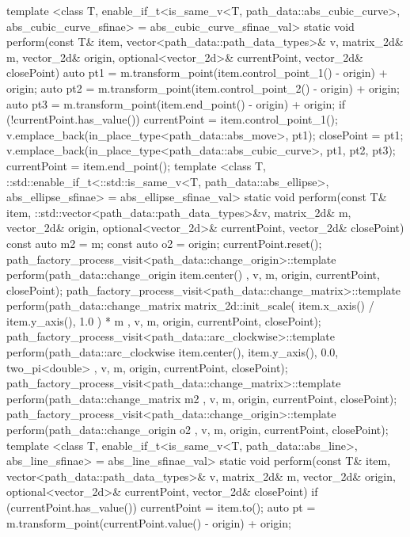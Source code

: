 \begin{codeblock}
{{      template <class T, enable_if_t<is_same_v<T, path_data::abs_cubic_curve>, abs_cubic_curve_sfinae> = abs_cubic_curve_sfinae_val>
      static void perform(const T& item, vector<path_data::path_data_types>& v, matrix_2d& m, vector_2d& origin, optional<vector_2d>& currentPoint, vector_2d& closePoint) {
        auto pt1 = m.transform_point(item.control_point_1() - origin) + origin;
        auto pt2 = m.transform_point(item.control_point_2() - origin) + origin;
        auto pt3 = m.transform_point(item.end_point() - origin) + origin;
        if (!currentPoint.has_value()) {
          currentPoint = item.control_point_1();
          v.emplace_back(in_place_type<path_data::abs_move>, pt1);
          closePoint = pt1;
        }
        v.emplace_back(in_place_type<path_data::abs_cubic_curve>, pt1,
          pt2, pt3);
        currentPoint = item.end_point();
      }
      template <class T, ::std::enable_if_t<::std::is_same_v<T, path_data::abs_ellipse>, abs_ellipse_sfinae> = abs_ellipse_sfinae_val>
      static void perform(const T& item, ::std::vector<path_data::path_data_types>&v, matrix_2d& m, vector_2d& origin, optional<vector_2d>& currentPoint, vector_2d& closePoint) {
        const auto m2 = m;
        const auto o2 = origin;
        currentPoint.reset();
        path_factory_process_visit<path_data::change_origin>::template perform(path_data::change_origin{ item.center() }, v, m, origin, currentPoint, closePoint);
        path_factory_process_visit<path_data::change_matrix>::template perform(path_data::change_matrix{ matrix_2d::init_scale({ item.x_axis() / item.y_axis(), 1.0 }) * m }, v, m, origin, currentPoint, closePoint);
        path_factory_process_visit<path_data::arc_clockwise>::template perform(path_data::arc_clockwise{ item.center(), item.y_axis(), 0.0, two_pi<double> }, v, m, origin, currentPoint, closePoint);
        path_factory_process_visit<path_data::change_matrix>::template perform(path_data::change_matrix{ m2 }, v, m, origin, currentPoint, closePoint);
        path_factory_process_visit<path_data::change_origin>::template perform(path_data::change_origin{ o2 }, v, m, origin, currentPoint, closePoint);
      }
      template <class T, enable_if_t<is_same_v<T, path_data::abs_line>, abs_line_sfinae> = abs_line_sfinae_val>
      static void perform(const T& item, vector<path_data::path_data_types>& v, matrix_2d& m, vector_2d& origin, optional<vector_2d>& currentPoint, vector_2d& closePoint) {
        if (currentPoint.has_value()) {
          currentPoint = item.to();
          auto pt = m.transform_point(currentPoint.value() - origin) + origin;
}}}}
\end{codeblock}
